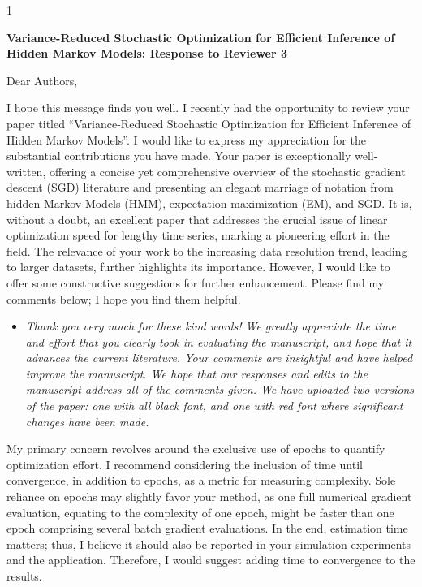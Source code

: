 \documentclass[11pt]{article}
\newcommand{\blind}{1}
\begin{document}
\blind
{
  \bigskip
  \bigskip
  \bigskip
  \begin{center}
    {\LARGE\bf Variance-Reduced Stochastic Optimization for Efficient Inference of Hidden Markov Models: Response to Reviewer 3}
  \end{center}
  \medskip
} \fi

Dear Authors,

I hope this message finds you well. I recently had the opportunity to review your paper titled “Variance-Reduced Stochastic Optimization for Efficient Inference of Hidden Markov Models”. I would like to express my appreciation for the substantial contributions you have made. Your paper is exceptionally well-written, offering a concise yet comprehensive overview of the stochastic gradient descent (SGD) literature and presenting an elegant marriage of notation from hidden Markov Models (HMM), expectation maximization (EM), and SGD. It is, without a doubt, an excellent paper that addresses the crucial issue of linear optimization speed for lengthy time series, marking a pioneering effort in the field. The relevance of your work to the increasing data resolution trend, leading to larger datasets, further highlights its importance. However, I would like to offer some constructive suggestions for further enhancement. Please find my comments below; I hope you find them helpful.

\begin{itemize}
    \item \textit{Thank you very much for these kind words! We greatly appreciate the time and effort that you clearly took in evaluating the manuscript, and hope that it advances the current literature. Your comments are insightful and have helped improve the manuscript. We hope that our responses and edits to the manuscript address all of the comments given. We have uploaded two versions of the paper: one with all black font, and one with red font where significant changes have been made.}
\end{itemize}

My primary concern revolves around the exclusive use of epochs to quantify optimization effort. I recommend considering the inclusion of time until convergence, in addition to epochs, as a metric for measuring complexity. Sole reliance on epochs may slightly favor your method, as one full numerical gradient evaluation, equating to the complexity of one epoch, might be faster than one epoch comprising several batch gradient evaluations. In the end, estimation time matters; thus, I believe it should also be reported in your simulation experiments and the application. Therefore, I would suggest adding time to convergence to the results. 
\end{document}
